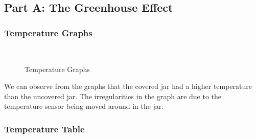 \documentclass[a4paper, 12pt, english]{article}
\begin{document}
\subsection{Part A: The Greenhouse Effect}
\subsubsection{Temperature Graphs}
\begin{figure}[H]
	\centering
	\\
	\qquad
	\qquad
	\caption{Temperature Graphs}
	\label{fig:TempGraphs}
\end{figure}

We can observe from the graphs that the covered jar had a higher temperature
than the uncovered jar. The irregularities in the graph are due to the
temperature sensor being moved around in the jar.

\subsubsection{Temperature Table}
\end{document}
